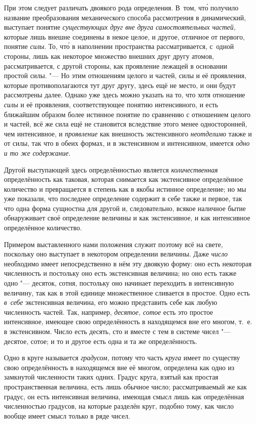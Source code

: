 При этом следует различать двоякого рода определения. В~том, чт\'{о} получило
название преобразования механического способа рассмотрения в динамический,
выступает понятие {\em существующих друг вне друга самостоятельных частей,}
которые лишь внешне соединены в некое целое, и другое, отличное от первого,
понятие {\em силы}. То, чт\'{о} в наполнении пространства рассматривается,
с~одной стороны, лишь как некоторое множество внешних друг другу атомов,
рассматривается, с другой стороны, как проявление лежащей в основании простой
силы. "--- Но этим отношениям целого и частей, силы и её проявления, которые
противополагаются тут друг другу, здесь ещё не место, и они будут рассмотрены
далее. Однако уже здесь можно указать на то, что хотя отношение {\em силы} и её
проявления, соответствующее понятию интенсивного, и есть ближайшим образом
более истинное понятие по сравнению с отношением целого и частей, всё же сила
ещё не становится вследствие этого менее односторонней, чем интенсивное, и
{\em проявление} как внешность экстенсивного {\em неотделимо} также и от силы,
так что в обеих формах, и в экстенсивном и интенсивном, имеется
{\em одно и то же содержание}.

Другой выступающей здесь определённостью является {\em количественная}
определённость как таковая, которая снимается как экстенсивное определённое
количество и превращается в степень как в якобы истинное определение; но мы уже
показали, что последнее определение содержит в себе также и первое, так что
одна форма сущностна для другой и, следовательно, всякое наличное бытие
обнаруживает своё определение величины и как экстенсивное, и как интенсивное определённое
количество.

Примером выставленного нами положения служит поэтому всё на свете, поскольку
оно выступает в некотором определении величины. Даже {\em число} необходимо
имеет непосредственно в нём эту двоякую форму: оно есть некоторая численность и
постольку оно есть экстенсивная величина; но оно есть также одно "--- десяток,
сотня, постольку оно начинает переходить в интенсивную величину, так как в этой
единице множественное сливается в простое. Одно есть {\em в~себе} экстенсивная
величина, его можно представить себе как любую численность частей. Так,
например, {\em десятое, сотое} есть это простое интенсивное, имеющее свою
определённость в находящемся вне его многом, т.~е. в экстенсивном. Число есть
десять, сто и вместе с тем в системе чисел "--- десятое, сотое; и то и другое
есть одна и та же определённость.

Одно в круге называется {\em градусом,} потому что часть {\em круга} имеет по
существу свою определённость в находящемся вне её многом, определена как одно
из замкнутой численности таких одних. Градус круга, взятый как простая
пространственная величина, есть лишь обычное число; рассматриваемый же как
градус, он есть интенсивная величина, имеющая смысл лишь как определённая
численностью градусов, на которые разделён круг, подобно тому, как число вообще
имеет смысл только в ряде чисел.

